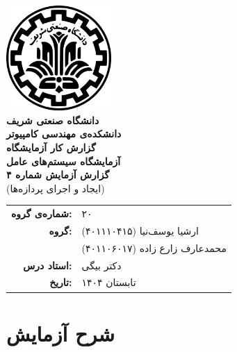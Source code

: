 \documentclass[12pt]{article}
\newcommand{\persianordinal}[1]{%
	\ifcase#1
	\or اول%
	\or دوم%
	\or سوم%
	\or چهارم%
	\or پنجم%
	\or ششم%
	\or هفتم%
	\or هشتم%
	\or نهم%
	\or دهم%
	\or یازدهم%
	\or دوازدهم%
	\or سیزدهم%
	\or چهاردهم%
	\or پانزدهم%
	\or شانزدهم%
	\or هفدهم%
	\or هجدهم%
	\or نوزدهم%
	\or بیستم%
	\else #1\fi
}
\newcommand{\persianordinalpage}{\persianfont\persianordinal{\value{page}}}
\begin{document}
	
	\begin{titlepage}
		\centering
		\vspace*{1cm}
		\includegraphics[width=4cm]{sharif.png}\\[1.5cm]
		{\Large\textbf{دانشگاه صنعتی شریف}}\\[0.5cm]
		{\large\textbf{دانشکده‌ی مهندسی کامپیوتر}}\\[1.5cm]
		{\Huge\textbf{گزارش کار آزمایشگاه}}\\[0.5cm]
		{\LARGE\textbf{آزمایشگاه سیستم‌های عامل}}\\[2cm]
		
		\textbf{گزارش آزمایش شماره ۴}\\
		(ایجاد و اجرای پردازه‌ها)
		
		\vfill
		\begin{tabular}{rl}
			\textbf{شماره‌ی گروه:} & ۲۰ \\
			\textbf{گروه:} &
			ارشیا یوسف‌نیا (۴۰۱۱۱۰۴۱۵) \\
			& محمدعارف زارع زاده (۴۰۱۱۰۶۰۱۷) \\
			\textbf{استاد درس:} & دکتر بیگی \\
			\textbf{تاریخ:} & تابستان ۱۴۰۴ \\
		\end{tabular}
	\end{titlepage}
	
	\clearpage
	\setcounter{page}{1}
	\renewcommand{\thepage}{\persianordinalpage}
	
	\tableofcontents
	\clearpage
	\listoffigures
	\clearpage
	\listoftables
	
	\clearpage
	\setcounter{page}{1}
	\renewcommand{\thepage}{\persianfont\arabic{page}}
	
	
        \section{شرح آزمایش}
\end{document}
